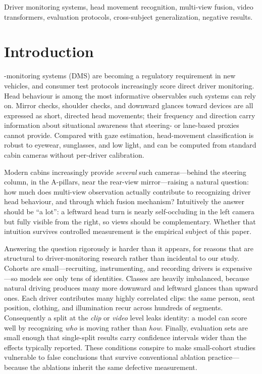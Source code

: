 \documentclass[journal]{IEEEtran}
\begin{document}
\begin{IEEEkeywords}
Driver monitoring systems, head movement recognition, multi-view fusion,
video transformers, evaluation protocols, cross-subject generalization,
negative results.
\end{IEEEkeywords}

\section{Introduction}
-monitoring systems (DMS) are becoming a regulatory
requirement in new vehicles, and consumer test protocols increasingly score
direct driver monitoring.  Head behaviour is among the most informative
observables such systems can rely on.  Mirror checks, shoulder checks, and
downward glances toward devices are all expressed as short, directed head
movements; their frequency and direction carry information about situational
awareness that steering- or lane-based proxies cannot provide.  Compared
with gaze estimation, head-movement classification is robust to eyewear,
sunglasses, and low light, and can be computed from standard cabin cameras
without per-driver calibration.

Modern cabins increasingly provide \emph{several} such cameras---behind the
steering column, in the A-pillars, near the rear-view mirror---raising a
natural question: how much does multi-view observation actually contribute
to recognizing driver head behaviour, and through which fusion mechanism?
Intuitively the answer should be ``a lot'': a leftward head turn is nearly
self-occluding in the left camera but fully visible from the right, so views
should be complementary.  Whether that intuition survives controlled
measurement is the empirical subject of this paper.

Answering the question rigorously is harder than it appears, for reasons that
are structural to driver-monitoring research rather than incidental to our
study.  Cohorts are small---recruiting, instrumenting, and recording drivers
is expensive---so models see only tens of identities.  Classes are heavily
imbalanced, because natural driving produces many more downward and leftward
glances than upward ones.  Each driver contributes many highly correlated
clips: the same person, seat position, clothing, and illumination recur
across hundreds of segments.  Consequently a split at the \emph{clip} or
\emph{video} level leaks identity: a model can score well by recognizing
\emph{who} is moving rather than \emph{how}.  Finally, evaluation sets are
small enough that single-split results carry confidence intervals wider than
the effects typically reported.  These conditions conspire to make
small-cohort studies vulnerable to false conclusions that survive
conventional ablation practice---because the ablations inherit the same
defective measurement.
\end{document}
